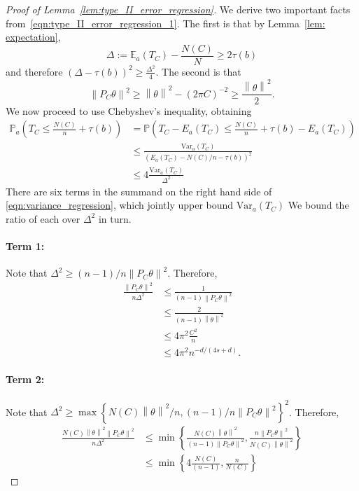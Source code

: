 \documentclass{article}
\newcommand{\norm}[1]{\left\lVert#1\right\rVert}
\newcommand{\set}[1]{\left\{#1\right\}}
\newcommand{\Var}{\mathrm{Var}}
\newcommand{\1}{\mathbb{I}}
\newcommand{\Pbb}{\mathbb{P}}
\newcommand{\Ebb}{\mathbb{E}}
\theoremstyle{alden}
\theoremstyle{aldenthm}
\theoremstyle{definition}
\theoremstyle{remark}
\begin{document}
\begin{proof}[Proof of Lemma~\ref{lem:type_II_error_regression}]
We derive two important facts from~\eqref{eqn:type_II_error_regression_1}. The first is that by Lemma~\ref{lem: expectation},
\begin{equation*}
\Delta := \Ebb_a(T_C) - \frac{N(C)}{N} \geq 2\tau(b)
\end{equation*}
and therefore $(\Delta - \tau(b))^2 \geq \frac{\Delta^2}{4}$. The second is that
\begin{equation*}
\norm{P_C\theta}^2 \geq \norm{\theta}^2 - (2\pi C)^{-2} \geq \frac{\norm{\theta}^2}{2}.
\end{equation*}
We now proceed to use Chebyshev's inequality, obtaining
\begin{align*}
\Pbb_a\left(T_C \leq \frac{N(C)}{n} + \tau(b) \right) & = \Pbb\left(T_C - E_a(T_C )\leq \frac{N(C)}{n} + \tau(b) - E_a(T_C) \right) \\
& \leq \frac{\Var_a(T_C)}{(E_a(T_C) - N(C)/n - \tau(b))^2} \\
& \leq 4\frac{\Var_a(T_C)}{\Delta^2}
\end{align*}
There are six terms in the summand on the right hand side of \eqref{eqn:variance_regression}, which jointly upper bound $\Var_a(T_C)$ We bound the ratio of each over $\Delta^2$ in turn.
\paragraph{Term 1:}
Note that $\Delta^2 \geq (n - 1)/n \norm{P_C\theta}^2$. Therefore,
\begin{align*}
\frac{\norm{P_C\theta}^2}{n\Delta^2} & \leq \frac{1}{(n - 1)\norm{P_C\theta}^2} \\
& \leq \frac{2}{(n - 1)\norm{\theta}^2} \\
& \leq 4\pi^2\frac{C^2}{n} \\
& \leq 4\pi^2n^{-d/(4s+d)}.
\end{align*}

\paragraph{Term 2:}
Note that $\Delta^2 \geq \max\set{N(C)\norm{\theta}^2/n, (n-1)/n\norm{P_C\theta}^2}^2$. Therefore,
\begin{align*}
\frac{N(C) \norm{\theta}^2 \norm{P_C\theta}^2}{n \Delta^2} & \leq \min\set{ \frac{N(C)\norm{\theta}^2}{(n - 1) \norm{P_C\theta}^2}, \frac{n \norm{P_C\theta}^2}{N(C) \norm{\theta}^2}} \\
& \leq \min \set{ 4 \frac{N(C)}{(n - 1)} , \frac{n}{N(C)} }
\end{align*}


\end{proof}
\end{document}
